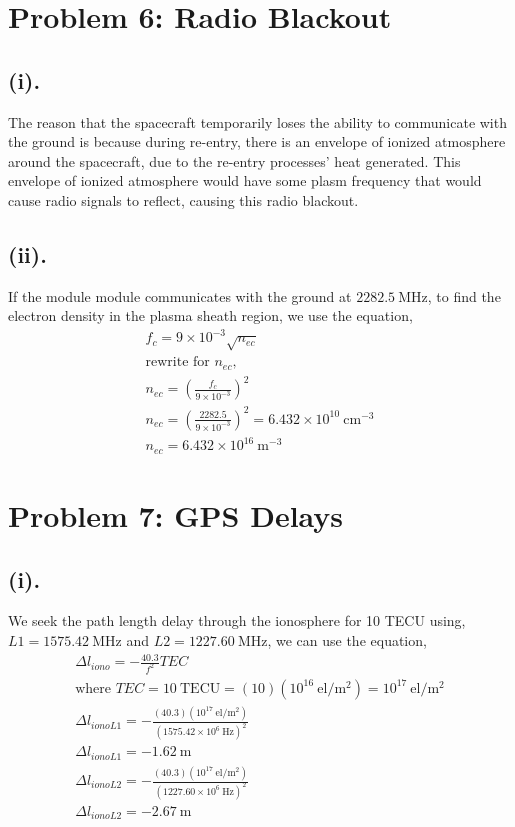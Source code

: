 \documentclass[11pt]{article}
\begin{document}
\newpage
\section*{Problem 6: Radio Blackout}
\subsection*{(i).}
\hspace*{2em}The reason that the spacecraft temporarily loses the ability to communicate
with the ground is because during re-entry, there is an envelope of ionized atmosphere around
the spacecraft, due to the re-entry processes' heat generated. This envelope of ionized atmosphere would
have some plasm frequency that would cause radio signals to reflect, causing this radio blackout.
\subsection*{(ii).}
\hspace*{2em}If the module module communicates with the ground at $2282.5~\mathrm{MHz}$, to find
the electron density in the plasma sheath region, we use the equation,
\begin{gather*}
f_c = 9\times10^{-3}\sqrt{n_{ec}} \\
\text{rewrite for } n_{ec} \text{,}\\
n_{ec} = (\frac{f_c}{9\times10^{-3}})^2 \\
n_{ec} = \left(\frac{2282.5}{9\times10^{-3}}\right)^2 = 6.432\times10^{10}~\mathrm{cm^{-3}} \\
\boxed{n_{ec} = 6.432\times10^{16}~\mathrm{m^{-3}}}
\end{gather*}

\newpage
\section*{Problem 7: GPS Delays}
\subsection*{(i).}
\hspace*{2em}We seek the path length delay through the ionosphere for 10 TECU using,
$L1 = 1575.42~\mathrm{MHz}$ and $L2 = 1227.60~\mathrm{MHz}$, we can use the equation,
\begin{gather*}
\Delta l_{iono} = -\frac{40.3}{f^2}TEC \\
\text{where } TEC = 10~\mathrm{TECU} = (10)(10^{16}~\mathrm{el/m^2}) = 10^{17}~\mathrm{el/m^2} \\
\Delta l_{iono L1} = -\frac{(40.3)(10^{17}~\mathrm{el/m^2})}{(1575.42\times10^{6}~\mathrm{Hz})^2} \\
\boxed{\Delta l_{iono L1} = -1.62~\mathrm{m}}\\
\Delta l_{iono L2} = -\frac{(40.3)(10^{17}~\mathrm{el/m^2})}{(1227.60\times10^{6}~\mathrm{Hz})^2} \\
\boxed{\Delta l_{iono L2} = -2.67~\mathrm{m}}
\end{gather*}
\end{document}
